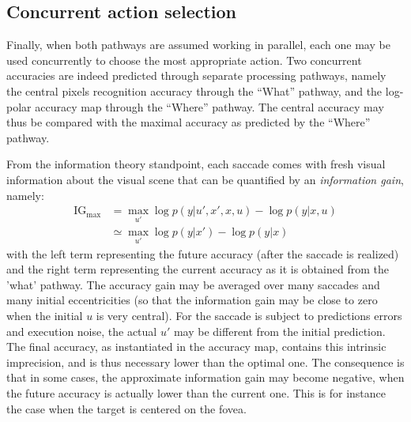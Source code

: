 \subsection*{Concurrent action selection}

Finally, when both pathways are assumed working in parallel, each one may be used concurrently to choose the most appropriate action. Two concurrent accuracies are indeed  predicted through separate processing pathways, namely the central pixels recognition accuracy through the ``What'' pathway, and the log-polar accuracy map through the ``Where'' pathway. The central accuracy may thus be compared with the maximal accuracy as predicted by the ``Where'' pathway. 

From the information theory standpoint, each saccade comes with fresh visual information about the visual scene that can be quantified by an \emph{information gain}, namely:
\begin{align}
\text{IG}_\text{max} &= \max_{u'} \log p(y|u',x',x, u) - \log p(y|x, u)\nonumber\\
&\simeq \max_{u'} \log p(y|x') - \log p(y|x)\label{eq:IG}
\end{align}
with the left term representing the future accuracy (after the saccade is realized) and the right term representing the current accuracy as it is obtained from the 'what' pathway. The accuracy gain may be averaged over many saccades and many initial eccentricities (so that the information gain may be close to zero when the initial $u$ is very central).
For the saccade is subject to predictions errors and execution noise, the actual $u'$ may be different from the initial prediction. The final accuracy, as instantiated in the accuracy map, contains this intrinsic imprecision, and is thus necessary lower than the optimal one. The consequence is that in some cases, the approximate information gain may become negative, when the future accuracy is actually lower than the current one. This is for instance the case when the target is centered on the fovea. 

